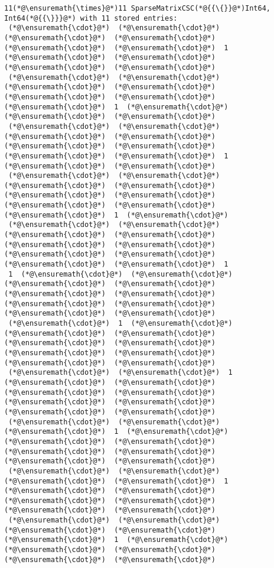 \documentclass[12pt,a4paper]{article}
\begin{document}
\begin{lstlisting}
11(*@\ensuremath{\times}@*)11 SparseMatrixCSC(*@{{\{}}@*)Int64, Int64(*@{{\}}}@*) with 11 stored entries:
 (*@\ensuremath{\cdot}@*)  (*@\ensuremath{\cdot}@*)  (*@\ensuremath{\cdot}@*)  (*@\ensuremath{\cdot}@*)  (*@\ensuremath{\cdot}@*)  (*@\ensuremath{\cdot}@*)  1  (*@\ensuremath{\cdot}@*)  (*@\ensuremath{\cdot}@*)  (*@\ensuremath{\cdot}@*)  (*@\ensuremath{\cdot}@*)
 (*@\ensuremath{\cdot}@*)  (*@\ensuremath{\cdot}@*)  (*@\ensuremath{\cdot}@*)  (*@\ensuremath{\cdot}@*)  (*@\ensuremath{\cdot}@*)  (*@\ensuremath{\cdot}@*)  (*@\ensuremath{\cdot}@*)  1  (*@\ensuremath{\cdot}@*)  (*@\ensuremath{\cdot}@*)  (*@\ensuremath{\cdot}@*)
 (*@\ensuremath{\cdot}@*)  (*@\ensuremath{\cdot}@*)  (*@\ensuremath{\cdot}@*)  (*@\ensuremath{\cdot}@*)  (*@\ensuremath{\cdot}@*)  (*@\ensuremath{\cdot}@*)  (*@\ensuremath{\cdot}@*)  (*@\ensuremath{\cdot}@*)  1  (*@\ensuremath{\cdot}@*)  (*@\ensuremath{\cdot}@*)
 (*@\ensuremath{\cdot}@*)  (*@\ensuremath{\cdot}@*)  (*@\ensuremath{\cdot}@*)  (*@\ensuremath{\cdot}@*)  (*@\ensuremath{\cdot}@*)  (*@\ensuremath{\cdot}@*)  (*@\ensuremath{\cdot}@*)  (*@\ensuremath{\cdot}@*)  (*@\ensuremath{\cdot}@*)  1  (*@\ensuremath{\cdot}@*)
 (*@\ensuremath{\cdot}@*)  (*@\ensuremath{\cdot}@*)  (*@\ensuremath{\cdot}@*)  (*@\ensuremath{\cdot}@*)  (*@\ensuremath{\cdot}@*)  (*@\ensuremath{\cdot}@*)  (*@\ensuremath{\cdot}@*)  (*@\ensuremath{\cdot}@*)  (*@\ensuremath{\cdot}@*)  (*@\ensuremath{\cdot}@*)  1
 1  (*@\ensuremath{\cdot}@*)  (*@\ensuremath{\cdot}@*)  (*@\ensuremath{\cdot}@*)  (*@\ensuremath{\cdot}@*)  (*@\ensuremath{\cdot}@*)  (*@\ensuremath{\cdot}@*)  (*@\ensuremath{\cdot}@*)  (*@\ensuremath{\cdot}@*)  (*@\ensuremath{\cdot}@*)  (*@\ensuremath{\cdot}@*)
 (*@\ensuremath{\cdot}@*)  1  (*@\ensuremath{\cdot}@*)  (*@\ensuremath{\cdot}@*)  (*@\ensuremath{\cdot}@*)  (*@\ensuremath{\cdot}@*)  (*@\ensuremath{\cdot}@*)  (*@\ensuremath{\cdot}@*)  (*@\ensuremath{\cdot}@*)  (*@\ensuremath{\cdot}@*)  (*@\ensuremath{\cdot}@*)
 (*@\ensuremath{\cdot}@*)  (*@\ensuremath{\cdot}@*)  1  (*@\ensuremath{\cdot}@*)  (*@\ensuremath{\cdot}@*)  (*@\ensuremath{\cdot}@*)  (*@\ensuremath{\cdot}@*)  (*@\ensuremath{\cdot}@*)  (*@\ensuremath{\cdot}@*)  (*@\ensuremath{\cdot}@*)  (*@\ensuremath{\cdot}@*)
 (*@\ensuremath{\cdot}@*)  (*@\ensuremath{\cdot}@*)  (*@\ensuremath{\cdot}@*)  1  (*@\ensuremath{\cdot}@*)  (*@\ensuremath{\cdot}@*)  (*@\ensuremath{\cdot}@*)  (*@\ensuremath{\cdot}@*)  (*@\ensuremath{\cdot}@*)  (*@\ensuremath{\cdot}@*)  (*@\ensuremath{\cdot}@*)
 (*@\ensuremath{\cdot}@*)  (*@\ensuremath{\cdot}@*)  (*@\ensuremath{\cdot}@*)  (*@\ensuremath{\cdot}@*)  1  (*@\ensuremath{\cdot}@*)  (*@\ensuremath{\cdot}@*)  (*@\ensuremath{\cdot}@*)  (*@\ensuremath{\cdot}@*)  (*@\ensuremath{\cdot}@*)  (*@\ensuremath{\cdot}@*)
 (*@\ensuremath{\cdot}@*)  (*@\ensuremath{\cdot}@*)  (*@\ensuremath{\cdot}@*)  (*@\ensuremath{\cdot}@*)  (*@\ensuremath{\cdot}@*)  1  (*@\ensuremath{\cdot}@*)  (*@\ensuremath{\cdot}@*)  (*@\ensuremath{\cdot}@*)  (*@\ensuremath{\cdot}@*)  (*@\ensuremath{\cdot}@*)
\end{lstlisting}
\end{document}
